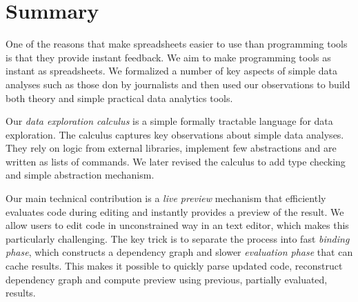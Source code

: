 \documentclass[english,submission]{programming}
\theoremstyle{plain}
\theoremstyle{definition}
\begin{document}
%
%
%
%
%
%
%
%
%
%
%
%
%
\section{Summary}
One of the reasons that make spreadsheets easier to use than programming tools is that they
provide instant feedback. We aim to make programming tools as instant as spreadsheets.
We formalized a number of key aspects of simple data analyses such as those don by journalists
and then used our observations to build both theory and simple practical data analytics tools.

Our \emph{data exploration calculus} is a simple formally tractable language
for data exploration. The calculus captures key observations about simple data analyses. They
rely on logic from external libraries, implement few abstractions and are written as lists of
commands. We later revised the calculus to add type checking and simple abstraction mechanism.

Our main technical contribution is a \emph{live preview} mechanism that efficiently evaluates
code during editing and instantly provides a preview of the result. We allow users to edit code
in unconstrained way in an text editor, which makes this particularly challenging. The key trick
is to separate the process into fast \emph{binding phase}, which constructs a dependency graph
and slower \emph{evaluation phase} that can cache results. This makes it possible to quickly parse
updated code, reconstruct dependency graph and compute preview using previous, partially
evaluated, results.
\end{document}
